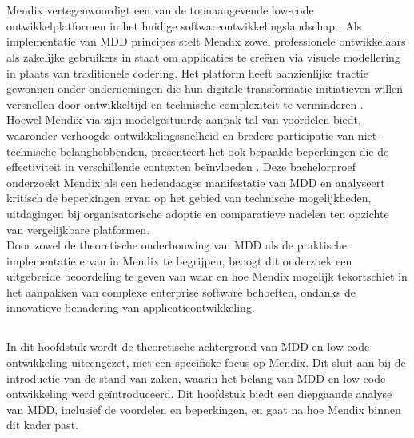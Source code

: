 \chapter{}%
\label{ch:stand-van-zaken}

Mendix vertegenwoordigt een van de toonaangevende low-code ontwikkelplatformen in het huidige softwareontwikkelingslandschap \autocite{Hermans2023}. Als implementatie van \gls{MDD} principes stelt Mendix zowel professionele ontwikkelaars als zakelijke gebruikers in staat om applicaties te creëren via visuele modellering in plaats van traditionele codering. Het platform heeft aanzienlijke tractie gewonnen onder ondernemingen die hun digitale transformatie-initiatieven willen versnellen door ontwikkeltijd en technische complexiteit te verminderen \autocite{Oosten2020}.
\\
Hoewel Mendix via zijn modelgestuurde aanpak tal van voordelen biedt, waaronder verhoogde ontwikkelingssnelheid en bredere participatie van niet-technische belanghebbenden, presenteert het ook bepaalde beperkingen die de effectiviteit in verschillende contexten beïnvloeden \autocite{Yerukala2022}. Deze bachelorproef onderzoekt Mendix als een hedendaagse manifestatie van \gls{MDD} en analyseert kritisch de beperkingen ervan op het gebied van technische mogelijkheden, uitdagingen bij organisatorische adoptie en comparatieve nadelen ten opzichte van vergelijkbare platformen.
\\
Door zowel de theoretische onderbouwing van \gls{MDD} als de praktische implementatie ervan in Mendix te begrijpen, beoogt dit onderzoek een uitgebreide beoordeling te geven van waar en hoe Mendix mogelijk tekortschiet in het aanpakken van complexe enterprise software behoeften, ondanks de innovatieve benadering van applicatieontwikkeling.
\newpage

\section{}%
In dit hoofdstuk wordt de theoretische achtergrond van \gls{MDD} en low-code ontwikkeling uiteengezet, met een specifieke focus op Mendix. Dit sluit aan bij de introductie van de stand van zaken, waarin het belang van \gls{MDD} en low-code ontwikkeling werd geïntroduceerd. Dit hoofdstuk biedt een diepgaande analyse van \gls{MDD}, inclusief de voordelen en beperkingen, en gaat na hoe Mendix binnen dit kader past.

